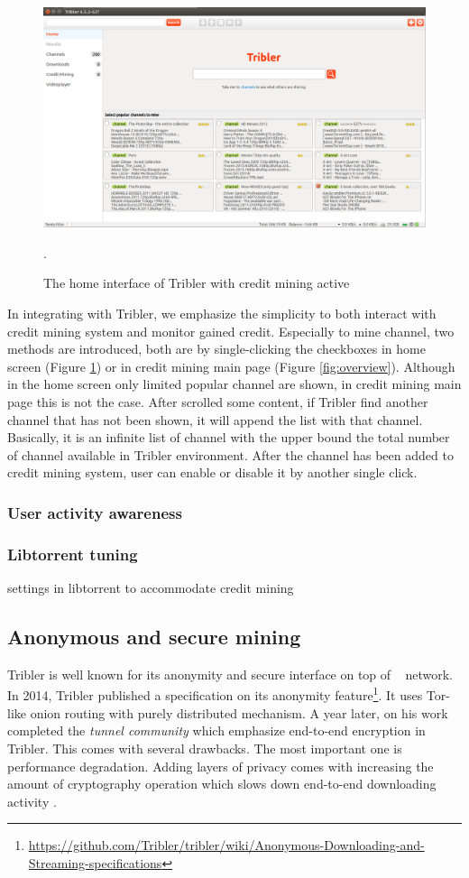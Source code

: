\begin{figure}
	\includegraphics[width=\textwidth]{pics/home_channel.png}
	\caption{The home interface of Tribler with credit mining active}.
	\label{fig:homecm}
\end{figure}

In integrating with Tribler, we emphasize the simplicity to both interact with credit mining system and monitor gained credit. Especially to mine channel, two methods are introduced, both are by single-clicking the checkboxes in home screen (Figure \ref{fig:homecm}) or in credit mining main page (Figure \ref{fig:overview}). Although in the home screen only limited popular channel are shown, in credit mining main page this is not the case. After scrolled some content, if Tribler find another channel that has not been shown, it will append the list with that channel. Basically, it is an infinite list of channel with the upper bound the total number of channel available in Tribler environment. After the channel has been added to credit mining system, user can enable or disable it by another single click.

\subsubsection{User activity awareness}


\subsubsection{Libtorrent tuning}
settings in libtorrent to accommodate credit mining
\subsection{Anonymous and secure mining}
Tribler is well known for its anonymity and secure interface on top of \bt~ network. In 2014, Tribler published a specification on its anonymity feature\footnote{\url{https://github.com/Tribler/tribler/wiki/Anonymous-Downloading-and-Streaming-specifications}}. It uses Tor-like onion routing with purely distributed mechanism. A year later, \citeauthor{2015:tunnel:ruigrok} on his work completed the \textit{tunnel community} which emphasize end-to-end encryption in Tribler. This comes with several drawbacks. The most important one is performance degradation. Adding layers of privacy comes with increasing the amount of cryptography operation which slows down end-to-end downloading activity \cite{2015:tunnel:ruigrok}.


